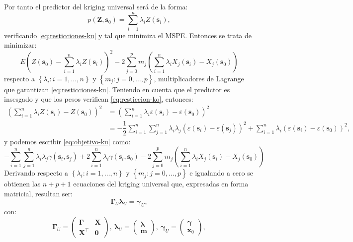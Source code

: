 \documentclass[
]{book}
\theoremstyle{break}
\theoremstyle{definition}
\theoremstyle{definition}
\theoremstyle{definition}
\theoremstyle{definition}
\theoremstyle{remark}
\begin{document}
Por tanto el predictor del kriging universal será de la forma:
\[p(\mathbf{Z},\mathbf{s}_{0})=\sum\limits_{i=1}^{n}\lambda_{i} Z(\mathbf{s}_{i}),\]
verificando \eqref{eq:resticciones-ku} y tal que minimiza el MSPE.
Entonces se trata de minimizar:
\begin{equation}
  E\left( Z(\mathbf{s}_{0})-\sum\limits_{i=1}^{n}\lambda_{i} Z(\mathbf{s}_{i}) \right)^{2} - 2\sum\limits_{j=0}^{p}m_{j} \left( \sum\limits_{i=1}^{n} \lambda_{i} X_{j} (\mathbf{s}_{i})- X_{j}(\mathbf{s}_{0}) \right)
  \label{eq:objetivo-ku}
\end{equation}
respecto a \(\left\{ \lambda_{i} :i=1, \ldots,n\right\}\) y \(\left\{ m_{j} :j=0, \ldots,p\right\}\), multiplicadores de Lagrange que garantizan \eqref{eq:resticciones-ku}.
Teniendo en cuenta que el predictor es insesgado y que los pesos verifican \eqref{eq:resticcion-ko}, entonces:
\[\begin{aligned}
\left( \sum\limits_{i=1}^{n}\lambda_{i} Z(\mathbf{s}_{i}) - Z(\mathbf{s}_{0})\right)^2  
& = \left( \sum\limits_{i=1}^{n}\lambda_{i} \varepsilon(\mathbf{s}_{i}) - \varepsilon(\mathbf{s}_{0})\right)^2  \\
& = -\dfrac{1}{2} \sum\limits_{i=1}^{n}\sum\limits_{j=1}^{n}\lambda_{i}\lambda_{j} \left( \varepsilon(\mathbf{s}_{i}) - \varepsilon(\mathbf{s}_{j} )\right)^{2}  + \sum\limits_{i=1}^{n}\lambda_{i} \left( \varepsilon(\mathbf{s}_{i}) - \varepsilon(\mathbf{s}_{0}) \right)^{2},
\end{aligned}\]
y podemos escribir \eqref{eq:objetivo-ku} como:
\[-\sum\limits_{i=1}^{n}\sum\limits_{j=1}^{n}\lambda_{i} \lambda_{j}
\gamma(\mathbf{s}_{i},\mathbf{s}_{j} ) +2 \sum\limits_{i=1}^{n}\lambda
_{i} \gamma(\mathbf{s}_{i},\mathbf{s}_{0}) -2\sum\limits_{j=0}^{p}m_{j}
\left( \sum\limits_{i=1}^{n}\lambda_{i} X_{j} (\mathbf{s}_{i})-X_{j}
(\mathbf{s}_{0}) \right)\] Derivando respecto a
\(\left\{ \lambda_{i} :i=1, \ldots,n\right\}\) y
\(\left\{ m_{j} :j=0, \ldots,p\right\}\) e igualando a cero se obtienen las
\(n+p+1\) ecuaciones del kriging universal que, expresadas en forma
matricial, resultan ser:
\[\boldsymbol{\Gamma}_{U} \boldsymbol{\lambda}_{U} =\boldsymbol{\gamma}_{U},\]
con:
\[\boldsymbol{\Gamma}_{U} = \left( \begin{array}{lc}
\boldsymbol{\Gamma} & \mathbf{X} \\
\mathbf{X^\top } & \mathbf{0}
\end{array} \right) ,\ 
\boldsymbol{\lambda}_{U} = \left( \begin{array}{c}
\boldsymbol{\lambda} \\
\mathbf{m}
\end{array} \right) ,\ 
\boldsymbol{\gamma}_{U} =\left( \begin{array}{c}
\boldsymbol{\gamma} \\
\mathbf{x}_0
\end{array} \right),\]
\end{document}
